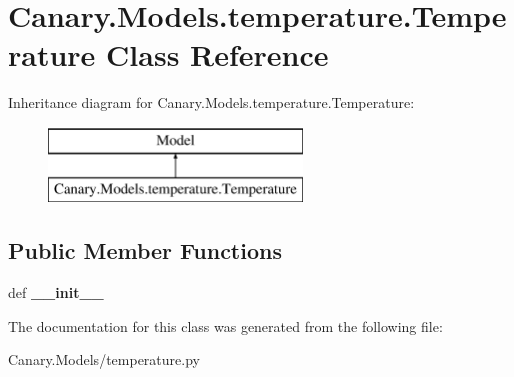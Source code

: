 \hypertarget{class_canary_8_models_1_1temperature_1_1_temperature}{\section{Canary.\-Models.\-temperature.\-Temperature Class Reference}
\label{class_canary_8_models_1_1temperature_1_1_temperature}
}
Inheritance diagram for Canary.\-Models.\-temperature.\-Temperature\-:\begin{figure}[H]
\begin{center}
\leavevmode
\includegraphics[height=2.000000cm]{class_canary_8_models_1_1temperature_1_1_temperature}
\end{center}
\end{figure}
\subsection*{Public Member Functions}
\begin{DoxyCompactItemize}
\item 
\hypertarget{class_canary_8_models_1_1temperature_1_1_temperature_a2eb18b8f1534a2242d84131d7b71af4a}{def {\bfseries \-\_\-\-\_\-init\-\_\-\-\_\-}}\label{class_canary_8_models_1_1temperature_1_1_temperature_a2eb18b8f1534a2242d84131d7b71af4a}

\end{DoxyCompactItemize}


The documentation for this class was generated from the following file\-:\begin{DoxyCompactItemize}
\item 
Canary.\-Models/temperature.\-py\end{DoxyCompactItemize}
